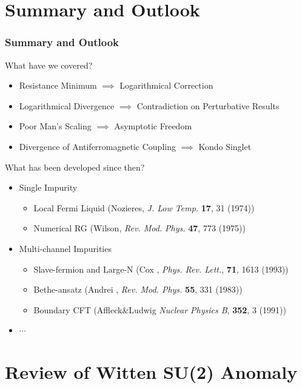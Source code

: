 \documentclass[10pt,aspectratio=43,xcolor=x11names,t]{beamer}%
\begin{document}
\section{Summary and Outlook}
	\begin{frame}\frametitle{Summary and Outlook}
		What have we covered?
		\begin{itemize}
			\item Resistance Minimum $\implies$ Logarithmical Correction
			\item Logarithmical Divergence $\implies$ Contradiction on Perturbative Results
			\item Poor Man's Scaling $\implies$ Asymptotic Freedom
			\item Divergence of Antiferromagnetic Coupling $\implies$ Kondo Singlet
		\end{itemize}
		\pause
		What has been developed since then?
		\begin{itemize}
			\item Single Impurity
			\begin{itemize}
				\item Local Fermi Liquid (Nozieres, \textit{J. Low Temp.} \textbf{17}, 31 (1974))
				\item Numerical RG (Wilson, \textit{Rev. Mod. Phys.} \textbf{47}, 773 (1975))
			\end{itemize}
			\item Multi-channel Impurities
			\begin{itemize}
				\item Slave-fermion and Large-N (Cox , \textit{Phys. Rev. Lett.}, \textbf{71}, 1613 (1993))
				\item Bethe-ansatz (Andrei , \textit{Rev. Mod. Phys.} \textbf{55}, 331 (1983))
				\item Boundary CFT (Affleck\&Ludwig \textit{Nuclear Physics B}, \textbf{352}, 3 (1991))
			\end{itemize}
			\item $\cdots$
		\end{itemize}
	\end{frame}
	

\section{Review of Witten SU(2) Anomaly}
\end{document}
